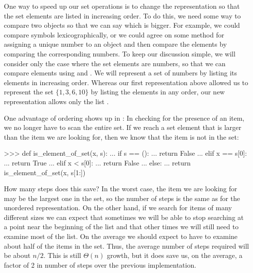 One way to speed up our set operations is to change the representation so that
the set elements are listed in increasing order.  To do this, we need some way
to compare two objects so that we can say which is bigger.  For example, we
could compare symbols lexicographically, or we could agree on some method for
assigning a unique number to an object and then compare the elements by
comparing the corresponding numbers.  To keep our discussion simple, we will
consider only the case where the set elements are numbers, so that we can
compare elements using \code{>} and \code{<}.  We will represent a set of
numbers by listing its elements in increasing order.  Whereas our first
representation above allowed us to represent the set \( \{1, 3, 6, 10\} \) by
listing the elements in any order, our new representation allows only the list
.

One advantage of ordering shows up in : In checking
for the presence of an item, we no longer have to scan the entire set.  If we
reach a set element that is larger than the item we are looking for, then we
know that the item is not in the set:

\begin{codeBlock}
>>> def is_element_of_set(x, s):
...     if s == ():
...         return False
...     elif x == s[0]:
...         return True
...     elif x < s[0]:
...         return False
...     else:
...         return is_element_of_set(x, s[1:])
\end{codeBlock}

\noindent
How many steps does this save?  In the worst case, the item we are looking for
may be the largest one in the set, so the number of steps is the same as for
the unordered representation.  On the other hand, if we search for items of
many different sizes we can expect that sometimes we will be able to stop
searching at a point near the beginning of the list and that other times we
will still need to examine most of the list.  On the average we should expect
to have to examine about half of the items in the set.  Thus, the average
number of steps required will be about \( n / 2 \).  This is still
\( \Theta(n) \) growth, but it does save us, on the average, a factor of 2
in number of steps over the previous implementation.

